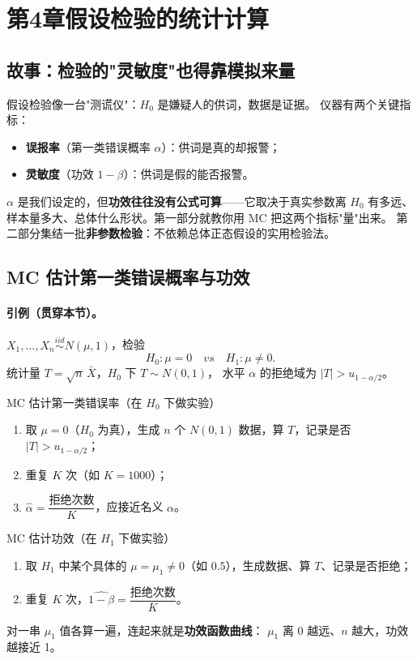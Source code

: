 \section{第4章\quad 假设检验的统计计算}

\subsection{故事：检验的"灵敏度"也得靠模拟来量}

假设检验像一台"测谎仪"：$H_0$ 是嫌疑人的供词，数据是证据。
仪器有两个关键指标：
\begin{itemize}[leftmargin=2em]
  \item \textbf{误报率}（第一类错误概率 $\alpha$）：供词是真的却报警；
  \item \textbf{灵敏度}（功效 $1-\beta$）：供词是假的能否报警。
\end{itemize}
$\alpha$ 是我们设定的，但\textbf{功效往往没有公式可算}——它取决于真实参数离 $H_0$
有多远、样本量多大、总体什么形状。第一部分就教你用 MC 把这两个指标"量"出来。
第二部分集结一批\textbf{非参数检验}：不依赖总体正态假设的实用检验法。

\subsection{MC 估计第一类错误概率与功效}

\paragraph{引例（贯穿本节）。}
$X_1,\dots,X_n\overset{iid}{\sim}N(\mu,1)$，检验
\[
H_0:\mu=0\quad vs\quad H_1:\mu\ne0 .
\]
统计量 $T=\sqrt n\,\bar X$，$H_0$ 下 $T\sim N(0,1)$，
水平 $\alpha$ 的拒绝域为 $|T|>u_{1-\alpha/2}$。

\begin{ebox}{MC 估计第一类错误率（在 $H_0$ 下做实验）}
\begin{enumerate}[leftmargin=2em]
  \item 取 $\mu=0$（$H_0$ 为真），生成 $n$ 个 $N(0,1)$ 数据，算 $T$，记录是否 $|T|>u_{1-\alpha/2}$；
  \item 重复 $K$ 次（如 $K=1000$）；
  \item $\hat\alpha=\dfrac{\text{拒绝次数}}{K}$，应接近名义 $\alpha$。
\end{enumerate}
\end{ebox}

\begin{ebox}{MC 估计功效（在 $H_1$ 下做实验）}
\begin{enumerate}[leftmargin=2em]
  \item 取 $H_1$ 中某个具体的 $\mu=\mu_1\ne0$（如 $0.5$），生成数据、算 $T$、记录是否拒绝；
  \item 重复 $K$ 次，$\widehat{1-\beta}=\dfrac{\text{拒绝次数}}{K}$。
\end{enumerate}
对一串 $\mu_1$ 值各算一遍，连起来就是\textbf{功效函数曲线}：
$\mu_1$ 离 0 越远、$n$ 越大，功效越接近 1。
\end{ebox}

